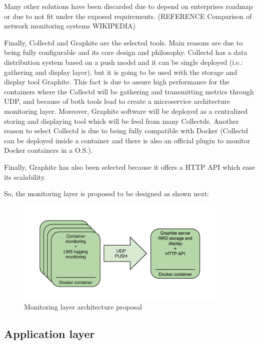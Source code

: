 Many other solutions have been discarded due to depend on enterprises roadmap or due to not fit under the exposed requirements. (REFERENCE Comparison of network monitoring systems WIKIPEDIA) 

Finally, Collectd and Graphite are the selected tools. Main reasons are due to being fully configurable and its core design and philosophy. Collectd has a data distribution system based on a push model and it can be single deployed (i.e.: gathering and display layer), but it is going to be used with the storage and display tool Graphite. This fact is due to assure high performance for the containers where the Collectd will be gathering and transmitting metrics through UDP, and because of both tools lead to create a microservice architecture monitoring layer. Moreover, Graphite software will be deployed as a centralized storing and displaying tool which will be feed from many Collectds. Another reason to select Collectd is due to being fully compatible with Docker (Collectd can be deployed inside a container and there is also an official plugin to monitor Docker containers in a O.S.). 

Finally, Graphite has also been selected because it offers a HTTP API which ease its scalability. 

So, the monitoring layer is proposed to be designed as shown next:

\begin{figure}[htb]
\begin{center}
\includegraphics[width=0.9\textwidth]{./images/mlap.png}
\caption{Monitoring layer architecture proposal}
\label{F:MLAP}
\end{center}
\end{figure}

\subsection{Application layer}

